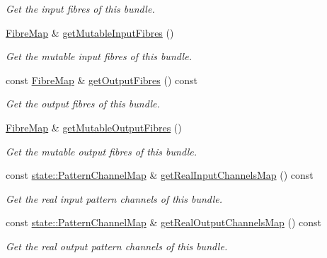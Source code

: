\begin{DoxyCompactItemize}
\begin{DoxyCompactList}\small\item\em \-Get the input fibres of this bundle. \end{DoxyCompactList}\item 
\hyperlink{classcryomesh_1_1structures_1_1FibreMap}{\-Fibre\-Map} \& \hyperlink{classcryomesh_1_1structures_1_1Bundle_af8b848abb7ec12997b09c63c0c10650d}{get\-Mutable\-Input\-Fibres} ()
\begin{DoxyCompactList}\small\item\em \-Get the mutable input fibres of this bundle. \end{DoxyCompactList}\item 
const \hyperlink{classcryomesh_1_1structures_1_1FibreMap}{\-Fibre\-Map} \& \hyperlink{classcryomesh_1_1structures_1_1Bundle_a2c14a3f2cc96236bff6548e5103183de}{get\-Output\-Fibres} () const 
\begin{DoxyCompactList}\small\item\em \-Get the output fibres of this bundle. \end{DoxyCompactList}\item 
\hyperlink{classcryomesh_1_1structures_1_1FibreMap}{\-Fibre\-Map} \& \hyperlink{classcryomesh_1_1structures_1_1Bundle_af9fd12e753bab64750f5c32d5f17a554}{get\-Mutable\-Output\-Fibres} ()
\begin{DoxyCompactList}\small\item\em \-Get the mutable output fibres of this bundle. \end{DoxyCompactList}\item 
const \hyperlink{classcryomesh_1_1state_1_1PatternChannelMap}{state\-::\-Pattern\-Channel\-Map} \& \hyperlink{classcryomesh_1_1structures_1_1Bundle_ada0ae8374d27d9b59ca82b8075fbd401}{get\-Real\-Input\-Channels\-Map} () const 
\begin{DoxyCompactList}\small\item\em \-Get the real input pattern channels of this bundle. \end{DoxyCompactList}\item 
const \hyperlink{classcryomesh_1_1state_1_1PatternChannelMap}{state\-::\-Pattern\-Channel\-Map} \& \hyperlink{classcryomesh_1_1structures_1_1Bundle_a893be908a14ecc2d07270273d3d127e2}{get\-Real\-Output\-Channels\-Map} () const 
\begin{DoxyCompactList}\small\item\em \-Get the real output pattern channels of this bundle. \end{DoxyCompactList}\item 

\end{DoxyCompactItemize}
